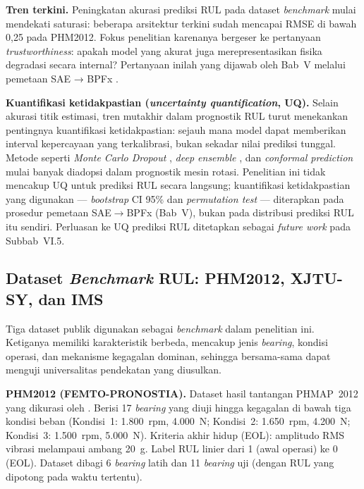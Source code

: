 \textbf{Tren terkini.} Peningkatan akurasi prediksi RUL pada dataset
\emph{benchmark} mulai mendekati saturasi: beberapa arsitektur terkini sudah
mencapai RMSE di bawah 0,25 pada PHM2012. Fokus penelitian karenanya bergeser
ke pertanyaan \emph{trustworthiness}: apakah model yang akurat juga
merepresentasikan fisika degradasi secara internal? Pertanyaan inilah yang
dijawab oleh Bab~V melalui pemetaan SAE → BPFx
.

{\color{blue}\textbf{Kuantifikasi ketidakpastian (\emph{uncertainty quantification}, UQ).}
Selain akurasi titik estimasi, tren mutakhir dalam prognostik RUL turut menekankan
pentingnya kuantifikasi ketidakpastian: sejauh mana model dapat memberikan
interval kepercayaan yang terkalibrasi, bukan sekadar nilai prediksi tunggal.
Metode seperti \emph{Monte Carlo Dropout} ,
\emph{deep ensemble} , dan
\emph{conformal prediction} 
mulai banyak diadopsi dalam prognostik mesin rotasi.
Penelitian ini tidak mencakup UQ untuk prediksi RUL secara langsung;
kuantifikasi ketidakpastian yang digunakan — \emph{bootstrap} CI 95\% dan
\emph{permutation test} — diterapkan pada prosedur pemetaan SAE$\to$BPFx
(Bab~V), bukan pada distribusi prediksi RUL itu sendiri.
Perluasan ke UQ prediksi RUL ditetapkan sebagai \emph{future work} pada Subbab~VI.5.}

\subsection{Dataset \emph{Benchmark} RUL: PHM2012, XJTU-SY, dan IMS}
\label{subsec:bab2_dataset_rul}

Tiga dataset publik digunakan sebagai \emph{benchmark} dalam penelitian ini.
Ketiganya memiliki karakteristik berbeda, mencakup jenis \emph{bearing}, kondisi
operasi, dan mekanisme kegagalan dominan, sehingga bersama-sama dapat menguji
universalitas pendekatan yang diusulkan.

\textbf{PHM2012 (FEMTO-PRONOSTIA).} Dataset hasil tantangan PHMAP~2012 yang
dikurasi oleh . Berisi 17 \emph{bearing} yang
diuji hingga kegagalan di bawah tiga kondisi beban (Kondisi~1: 1.800~rpm,
4.000~N; Kondisi~2: 1.650~rpm, 4.200~N; Kondisi~3: 1.500~rpm, 5.000~N).
Kriteria akhir hidup (EOL): amplitudo RMS vibrasi melampaui ambang 20~g.
Label RUL linier dari 1 (awal operasi) ke 0 (EOL). Dataset dibagi 6 \emph{bearing}
latih dan 11 \emph{bearing} uji (dengan RUL yang dipotong pada waktu tertentu).


